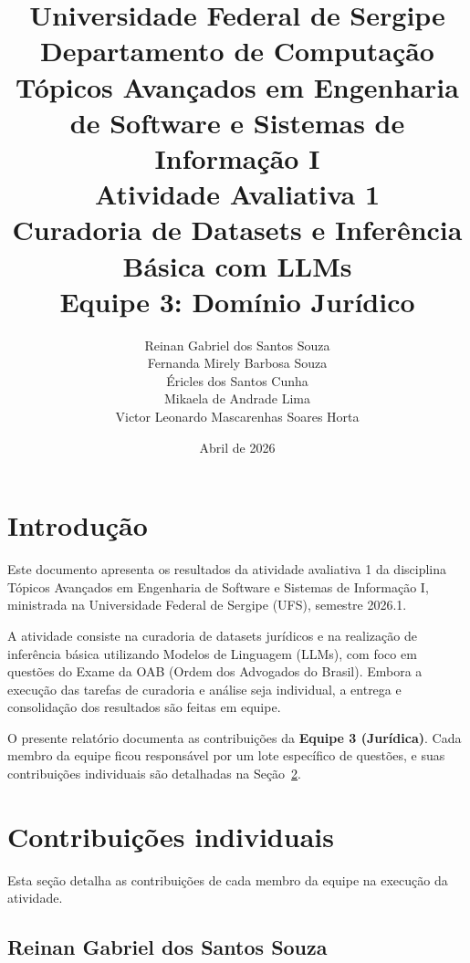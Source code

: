 \documentclass[12pt,a4paper]{article}
\title{%
  \vspace{-1cm}
  \large\textbf{Universidade Federal de Sergipe}\\[0.3cm]
  \normalsize Departamento de Computação\\
  Tópicos Avançados em Engenharia de Software e Sistemas de Informação I\\[1cm]
  \Large\textbf{Atividade Avaliativa 1}\\[0.3cm]
  \large Curadoria de Datasets e Inferência Básica com LLMs\\[0.3cm]
  \normalsize Equipe 3: Domínio Jurídico
}
\author{
  Reinan Gabriel dos Santos Souza \\
  Fernanda Mirely Barbosa Souza \\
  Éricles dos Santos Cunha \\
  Mikaela de Andrade Lima \\
  Victor Leonardo Mascarenhas Soares Horta
}
\date{Abril de 2026}
\begin{document}
\maketitle
\thispagestyle{empty}

\begin{center}
\end{center}

\vspace{0.5cm}
\newpage

\tableofcontents
\newpage

\section{Introdução}

Este documento apresenta os resultados da atividade avaliativa 1 da disciplina Tópicos Avançados em Engenharia de Software e Sistemas de Informação I, ministrada na Universidade Federal de Sergipe (UFS), semestre 2026.1.

A atividade consiste na curadoria de datasets jurídicos e na realização de inferência básica utilizando Modelos de Linguagem (LLMs), com foco em questões do Exame da OAB (Ordem dos Advogados do Brasil). Embora a execução das tarefas de curadoria e análise seja individual, a entrega e consolidação dos resultados são feitas em equipe.

O presente relatório documenta as contribuições da \textbf{Equipe 3 (Jurídica)}. Cada membro da equipe ficou responsável por um lote específico de questões, e suas contribuições individuais são detalhadas na Seção~\ref{sec:contribuicoes}.

\section{Contribuições individuais}
\label{sec:contribuicoes}

Esta seção detalha as contribuições de cada membro da equipe na execução da atividade.

\subsection{Reinan Gabriel dos Santos Souza}
\end{document}
